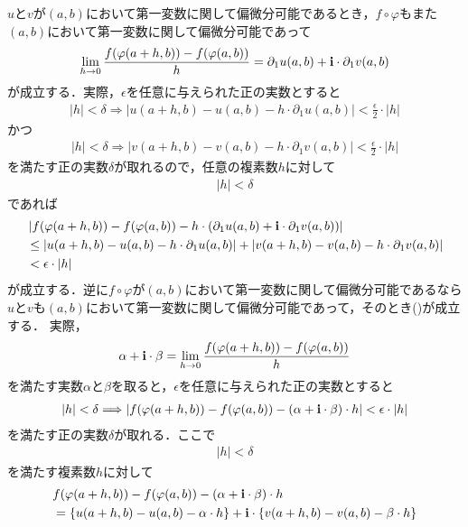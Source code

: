 	$u$と$v$が$(a,b)$において第一変数に関して偏微分可能であるとき，$f \circ \varphi$もまた
	$(a,b)$において第一変数に関して偏微分可能であって
	\begin{align}
		\lim_{h \to 0} \frac{f(\varphi(a+h,b)) - f(\varphi(a,b))}{h} = \partial_1 u(a,b) + \mathbf{i} \cdot \partial_1 v(a,b)
		\label{fom:Cauchy_Riemann_2}
	\end{align}
	が成立する．実際，$\epsilon$を任意に与えられた正の実数とすると
	\begin{align}
		|h| < \delta \Longrightarrow \left|u(a+h,b) - u(a,b) - h \cdot \partial_1 u(a,b)\right| < \frac{\epsilon}{2} \cdot |h|
	\end{align}
	かつ
	\begin{align}
		|h| < \delta \Longrightarrow \left|v(a+h,b) - v(a,b) - h \cdot \partial_1 v(a,b)\right| < \frac{\epsilon}{2} \cdot |h|
	\end{align}
	を満たす正の実数$\delta$が取れるので，任意の複素数$h$に対して
	\begin{align}
		|h| < \delta
	\end{align}
	であれば
	\begin{align}
		&\left|f(\varphi(a+h,b)) - f(\varphi(a,b)) - h \cdot (\partial_1 u(a,b) + \mathbf{i} \cdot \partial_1 v(a,b))\right| \\
		&\leq \left|u(a+h,b) - u(a,b) - h \cdot \partial_1 u(a,b)\right|
		 + \left|v(a+h,b) - v(a,b) - h \cdot \partial_1 v(a,b)\right| \\
		&< \epsilon \cdot |h|
	\end{align}
	が成立する．逆に$f \circ \varphi$が$(a,b)$において第一変数に関して偏微分可能であるなら
	$u$と$v$も$(a,b)$において第一変数に関して偏微分可能であって，そのとき()が成立する．
	実際，
	\begin{align}
		\alpha + \mathbf{i} \cdot \beta = \lim_{h \to 0} \frac{f(\varphi(a+h,b)) - f(\varphi(a,b))}{h}
	\end{align}
	を満たす実数$\alpha$と$\beta$を取ると，$\epsilon$を任意に与えられた正の実数とすると
	\begin{align}
		|h| < \delta \Longrightarrow \left|f(\varphi(a+h,b)) - f(\varphi(a,b)) - (\alpha + \mathbf{i} \cdot \beta) \cdot h\right| 
		< \epsilon \cdot |h|
	\end{align}
	を満たす正の実数$\delta$が取れる．ここで
	\begin{align}
		|h| < \delta
	\end{align}
	を満たす複素数$h$に対して
	\begin{align}
		&f(\varphi(a+h,b)) - f(\varphi(a,b)) - (\alpha + \mathbf{i} \cdot \beta) \cdot h \\
		&= \left\{u(a+h,b) - u(a,b) - \alpha \cdot h\right\}
		+ \mathbf{i} \cdot \left\{v(a+h,b) - v(a,b) - \beta \cdot h\right\}
	\end{align}
